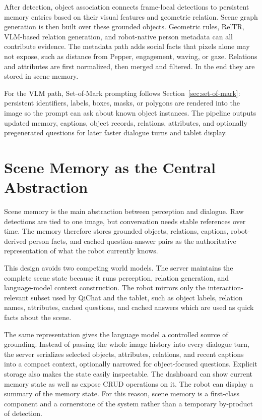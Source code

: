 After detection, object association connects frame-local detections to persistent memory entries based on their visual features and geometric relation.
Scene graph generation is then built over these grounded objects.
Geometric rules, RelTR, VLM-based relation generation, and robot-native person metadata can all contribute evidence.
The metadata path adds social facts that pixels alone may not expose, such as distance from Pepper, engagement, waving, or gaze.
Relations and attributes are first normalized, then merged and filtered. In the end they are stored in scene memory.

For the VLM path, Set-of-Mark prompting follows Section~\ref{sec:set-of-mark}: persistent identifiers, labels, boxes, masks, or polygons are rendered into the image so the prompt can ask about known object instances.
The pipeline outputs updated memory, captions, object records, relations, attributes, and optionally pregenerated questions for later faster dialogue turns and tablet display.

\section{Scene Memory as the Central Abstraction}\label{sec:architecture-scene-memory}

Scene memory is the main abstraction between perception and dialogue.
Raw detections are tied to one image, but conversation needs stable references over time.
The memory therefore stores grounded objects, relations, captions, robot-derived person facts, and cached question-answer pairs as the authoritative representation of what the robot currently knows.

This design avoids two competing world models.
The server maintains the complete scene state because it runs perception, relation generation, and language-model context construction.
The robot mirrors only the interaction-relevant subset used by QiChat and the tablet, such as object labels, relation names, attributes, cached questions, and cached answers which are used as quick facts about the scene.

The same representation gives the language model a controlled source of grounding.
Instead of passing the whole image history into every dialogue turn, the server serializes selected objects, attributes, relations, and recent captions into a compact context, optionally narrowed for object-focused questions.
Explicit storage also makes the state easily inspectable. The dashboard can show current memory state as well as expose CRUD operations on it. The robot can display a summary of the memory state.
For this reason, scene memory is a first-class component and a cornerstone of the system rather than a temporary by-product of detection.

